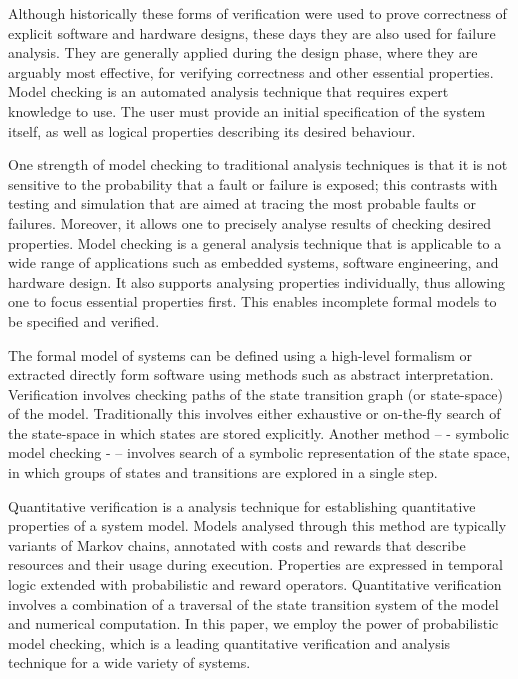 \documentclass[preprint,12pt]{qrei}
\begin{document}
Although historically these forms of verification were used to prove correctness of explicit software and hardware designs, these days they are also used for failure analysis. They are generally applied during the design phase, where they are arguably most effective, for verifying correctness and other essential properties. Model checking is an automated analysis technique that requires expert knowledge to use. The user must provide an initial specification of the system itself, as well as logical properties describing its desired behaviour.

One strength of model checking to traditional analysis techniques is that it is not sensitive to the probability that a fault or failure is exposed; this contrasts with testing and simulation that are aimed at tracing the most probable faults or failures. Moreover, it allows one to precisely analyse results of checking desired properties. Model checking is a general analysis technique that is applicable to a wide range of applications such as embedded systems, software engineering, and hardware design. It also supports analysing properties individually, thus allowing one to focus essential properties first. This enables incomplete formal models to be specified and verified.

The formal model of systems can be defined using a high-level formalism or extracted directly form software using methods such as abstract interpretation. Verification involves checking paths of the state transition graph (or state-space) of the model. Traditionally this involves either exhaustive or on-the-fly search of the state-space in which states are stored explicitly. Another method – - symbolic model checking \cite{CGP99} - – involves search of a symbolic representation of the state space, in which groups of states and transitions are explored in a single step.


Quantitative verification is a analysis technique for establishing quantitative properties of a system model. Models analysed through this method are typically variants of Markov chains, annotated with costs and rewards that describe resources and their usage during execution. Properties are expressed in temporal logic extended with probabilistic and reward operators. Quantitative verification involves a combination of a traversal of the state transition system of the model and numerical computation. In this paper, we employ the power of probabilistic model checking, which is a leading quantitative verification and analysis technique for a wide variety of systems.
\end{document}
